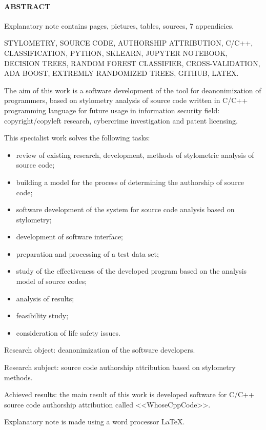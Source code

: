 \newpage
{}
\paragraph{\hfill ABSTRACT \hfill}
Explanatory note contains  pages,  pictures,  tables,
 sources, 7 appendicies.

STYLOMETRY, SOURCE CODE, AUTHORSHIP ATTRIBUTION, C/C++, CLASSIFICATION, PYTHON, SKLEARN,
JUPYTER NOTEBOOK, DECISION TREES, RANDOM FOREST CLASSIFIER, CROSS-VALIDATION, 
ADA BOOST, EXTREMLY RANDOMIZED TREES, GITHUB, LATEX.

The aim of this work is a software development of the tool for deanonimization of programmers, 
based on stylometry analysis of source code written in C/C++ programming language for future
usage in information security field: copyright/copyleft research, cybercrime investigation and patent licensing.

This specialist work solves the following tasks:
\begin{itemize}
  \item review of existing research, development, methods of stylometric analysis of source code;
  \item building a model for the process of determining the authorship of source code;
  \item software development of the system for source code analysis based on stylometry;
  \item development of software interface;
  \item preparation and processing of a test data set;
  \item study of the effectiveness of the developed program based on the analysis model of source codes;
  \item analysis of results;
  \item feasibility study;
  \item consideration of life safety issues.
\end{itemize}

Research object: deanonimization of the software developers.

Research subject: source code authorship attribution based on stylometry methods.

Achieved results: the main result of this work is developed software for C/C++ source code 
authorship attribution called <<WhoseCppCode>>.

Explanatory note is made using a word processor \LaTeX.
